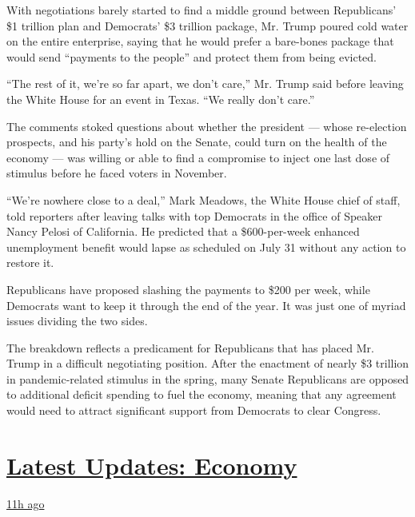 With negotiations barely started to find a middle ground between
Republicans' \$1 trillion plan and Democrats' \$3 trillion package, Mr.
Trump poured cold water on the entire enterprise, saying that he would
prefer a bare-bones package that would send ``payments to the people''
and protect them from being evicted.

``The rest of it, we're so far apart, we don't care,'' Mr. Trump said
before leaving the White House for an event in Texas. ``We really don't
care.''

The comments stoked questions about whether the president --- whose
re-election prospects, and his party's hold on the Senate, could turn on
the health of the economy --- was willing or able to find a compromise
to inject one last dose of stimulus before he faced voters in November.

``We're nowhere close to a deal,'' Mark Meadows, the White House chief
of staff, told reporters after leaving talks with top Democrats in the
office of Speaker Nancy Pelosi of California. He predicted that a
\$600-per-week enhanced unemployment benefit would lapse as scheduled on
July 31 without any action to restore it.

Republicans have proposed slashing the payments to \$200 per week, while
Democrats want to keep it through the end of the year. It was just one
of myriad issues dividing the two sides.

The breakdown reflects a predicament for Republicans that has placed Mr.
Trump in a difficult negotiating position. After the enactment of nearly
\$3 trillion in pandemic-related stimulus in the spring, many Senate
Republicans are opposed to additional deficit spending to fuel the
economy, meaning that any agreement would need to attract significant
support from Democrats to clear Congress.

\hypertarget{latest-updates-economy}{%
\section{\texorpdfstring{\href{https://www.nytimes3xbfgragh.onion/live/2020/08/04/business/stock-market-today-coronavirus?action=click\&pgtype=Article\&state=default\&region=MAIN_CONTENT_1\&context=storylines_live_updates}{Latest
Updates:
Economy}}{Latest Updates: Economy}}\label{latest-updates-economy}}

\href{https://www.nytimes3xbfgragh.onion/live/2020/08/04/business/stock-market-today-coronavirus?action=click\&pgtype=Article\&state=default\&region=MAIN_CONTENT_1\&context=storylines_live_updates\#fox-corporations-plunging-profit-is-cushioned-by-fox-news}{11h
ago}

